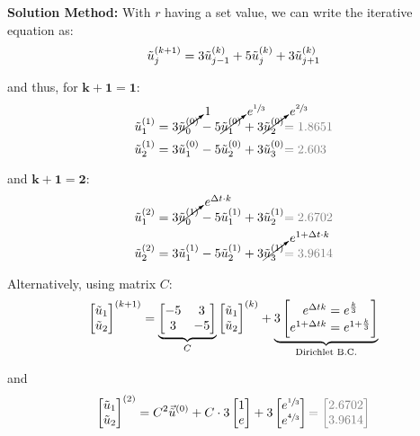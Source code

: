 \textbf{Solution Method:} With $r$ having a set value, we can write the iterative equation as:
\begin{align*}
	\tilde{u}_{j}^{(k+1)} = 3\tilde{u}_{j-1}^{(k)} + 5\tilde{u}_{j}^{(k)} + 3\tilde{u}_{j+1}^{(k)}
\end{align*}

and thus, for $\mathbf{k+1=1}$:
\begin{align*}
	\utild_1^{(1)} & = 3\cancelto{1}{\utild_0^{(0)}} - 5\cancelto{e^{\sfrac{1}{3}}}{\utild_1^{(0)}} + 3\cancelto{e^{\sfrac{2}{3}}}{\utild_2^{(0)}} {\color{gray} = 1.8651} \\
	\utild_2^{(1)} & = 3\utild_1^{(0)} - 5\utild_2^{(0)} + 3\utild_3^{(0)} {\color{gray} = 2.603}
\end{align*}

and $\mathbf{k+1 = 2}$:
\begin{align*}
	\utild_1^{(2)} & = 3\cancelto{e^{\Delta t\cdot k}}{\utild_0^{(1)}} - 5\utild_1^{(1)} + 3\utild_2^{(1)} {\color{gray} = 2.6702} \\
	\utild_2^{(2)} & = 3\utild_1^{(1)} - 5\utild_2^{(1)} + 3\cancelto{e^{1+\Delta t\cdot k}}{\utild_3^{(1)}} {\color{gray} = 3.9614}
\end{align*}

Alternatively, using matrix $C$:
\begin{align*}
	\begin{bmatrix}
		\tilde{u}_1 \\
		\tilde{u}_2
	\end{bmatrix}^{(k+1)}
	=
	\underbrace{
		\begin{bmatrix}
			-5 & 3 \\
			3 & -5
		\end{bmatrix}
	}_{C}
	\begin{bmatrix}
		\tilde{u}_1 \\
		\tilde{u}_2
	\end{bmatrix}^{(k)}
	+
	\underbrace{
		3\begin{bmatrix}
			e^{\Delta t k} = e^\frac{k}{3} \\
			e^{1+\Delta t k} = e^{1+\frac{k}{3}}
		\end{bmatrix}
	}_\text{Dirichlet B.C.}
\end{align*}

and
\begin{align*}
	\begin{bmatrix}
		\utild_1 \\
		\utild_2
	\end{bmatrix}^{(2)}
	=
	C^2\vec{\utild}^{(0)} + C\cdot 3\begin{bmatrix}
		1 \\
		e
	\end{bmatrix}
	+
	3\begin{bmatrix}
		e^{\sfrac{1}{3}} \\
		e^{\sfrac{4}{3}}
	\end{bmatrix}
	{\color{gray}
		=
		\begin{bmatrix}
			2.6702 \\
			3.9614
		\end{bmatrix}
	}
\end{align*}

